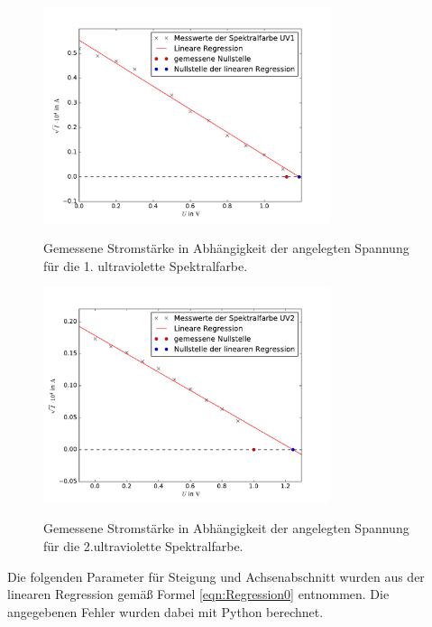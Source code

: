 \begin{figure}
  \centering
  \includegraphics[width = 0.75\textwidth]{Pics/UV1_Spektrallinie.pdf}\\[0cm]
  \caption{Gemessene Stromstärke in Abhängigkeit der angelegten Spannung für die
           1. ultraviolette Spektralfarbe.}
  \label{fig:UV1}
\end{figure}

\newpage



\begin{figure}
  \centering
  \includegraphics[width = 0.75\textwidth]{Pics/UV2_Spektrallinie.pdf}\\[0cm]
  \caption{Gemessene Stromstärke in Abhängigkeit der angelegten Spannung für die
           2.ultraviolette Spektralfarbe.}
  \label{fig:UV2}
\end{figure}

\newpage

Die folgenden Parameter für Steigung und Achsenabschnitt wurden aus der linearen
Regression gemäß Formel \eqref{eqn:Regression0} entnommen. Die angegebenen Fehler
wurden dabei mit Python berechnet.

